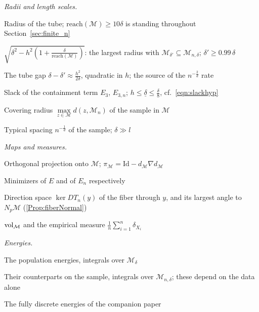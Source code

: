 \documentclass[11pt]{amsart}%
\newcommand*{\vol}{\rm{vol}}
\theoremstyle{plain}
\newcommand{\1}{\mathbf{1}}
\newcommand{\M}{\mathcal{M}}
\begin{document}
\smallskip
\noindent\textit{Radii and length scales.}
\begin{notation}
    \item[$\delta$] Radius of the tube; $\mathrm{reach}(\M)\ge10\delta$ is standing throughout
        Section~\ref{sec:finite_n}
    \item[$\delta'$] $\sqrt{\delta^2-h^2\left(1+\frac{\delta}{\mathrm{reach}(\M)}\right)}$: the largest radius with
        $\M_{\delta'}\subseteq\M_{n,\delta}$; $\delta'\ge0.99\,\delta$
    \item[$\eta$] The tube gap $\delta-\delta'\approx \frac{h^2}{2\delta}$, quadratic in $h$; the source
        of the $n^{-\frac{2}{d}}$ rate
    \item[$\underline\delta$] Slack of the containment term $E_3$, $E_{3,n}$;
        $h\le\underline\delta\le\frac{\delta}{8}$, cf.\ \eqref{eqn:slackhyp}
    \item[$h$] Covering radius $\max\limits_{z\in\M}d(z,\M_n)$ of the sample in $\M$
    \item[$l$] Typical spacing $n^{-\frac{1}{d}}$ of the sample; $\delta\gg l$
\end{notation}

\smallskip
\noindent\textit{Maps and measures.}
\begin{notation}
    \item[$\pi_\M$] Orthogonal projection onto $\M$; $\pi_\M=\mathrm{Id}-d_\M\nabla d_\M$
    \item[$T$, $T_n$] Minimizers of $E$ and of $E_n$ respectively
    \item[$F_y$, $\beta$] Direction space $\ker DT_n(y)$ of the fiber through $y$, and its largest
        angle to $N_p\M$ (\ref{Prop:fiberNormal})
    \item[$\mu$, $\mu_n$] $\vol_\M$ and the empirical measure $\frac1n\sum_{i=1}^n\delta_{X_i}$
\end{notation}

\smallskip
\noindent\textit{Energies.}
\begin{notation}
    \item[$E$, $E_k$] The population energies, integrals over $\M_\delta$
    \item[$E_{k,n}$] Their counterparts on the sample, integrals over $\M_{n,\delta}$; these depend on the data alone
    \item[$E_n$] The fully discrete energies of the companion paper
\end{notation}
\end{document}
